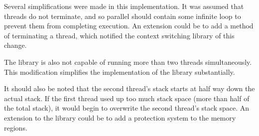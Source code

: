 \documentclass[a4paper]{article}
\begin{document}
Several simplifications were made in this implementation. It was assumed that threads do not terminate, and so parallel should contain some infinite loop to prevent them from completing execution. An extension could be to add a method of terminating a thread, which notified the context switching library of this change.

The library is also not capable of running more than two threads simultaneously. This modification simplifies the implementation of the library substantially.

It should also be noted that the second thread's stack starts at half way down the actual stack. If the first thread used up too much stack space (more than half of the total stack), it would begin to overwrite the second thread's stack space. An extension to the library could be to add a protection system to the memory regions.
\end{document}
